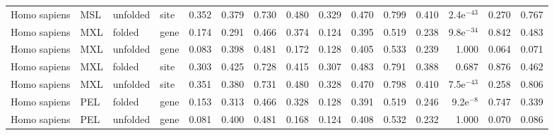 \begin{longtable}{llllrrrrrrrrrrr}
        Homo sapiens &                       MSL &  unfolded &  site &                              0.352 &                               0.379 &                 0.730 &                 0.480 &                              0.329 &                               0.470 &                 0.799 &                 0.410 &  2.4e$^{-43}$ &  0.270 &  0.767 \\
        Homo sapiens &                       MXL &    folded &  gene &                              0.174 &                               0.291 &                 0.466 &                 0.374 &                              0.124 &                               0.395 &                 0.519 &                 0.238 &  9.8e$^{-34}$ &  0.842 &  0.483 \\
        Homo sapiens &                       MXL &  unfolded &  gene &                              0.083 &                               0.398 &                 0.481 &                 0.172 &                              0.128 &                               0.405 &                 0.533 &                 0.239 &         1.000 &  0.064 &  0.071 \\
        Homo sapiens &                       MXL &    folded &  site &                              0.303 &                               0.425 &                 0.728 &                 0.415 &                              0.307 &                               0.483 &                 0.791 &                 0.388 &         0.687 &  0.876 &  0.462 \\
        Homo sapiens &                       MXL &  unfolded &  site &                              0.351 &                               0.380 &                 0.731 &                 0.480 &                              0.328 &                               0.470 &                 0.798 &                 0.410 &  7.5e$^{-43}$ &  0.258 &  0.806 \\
        Homo sapiens &                       PEL &    folded &  gene &                              0.153 &                               0.313 &                 0.466 &                 0.328 &                              0.128 &                               0.391 &                 0.519 &                 0.246 &   9.2e$^{-8}$ &  0.747 &  0.339 \\
        Homo sapiens &                       PEL &  unfolded &  gene &                              0.081 &                               0.400 &                 0.481 &                 0.168 &                              0.124 &                               0.408 &                 0.532 &                 0.232 &         1.000 &  0.070 &  0.086 \\

\end{longtable}
